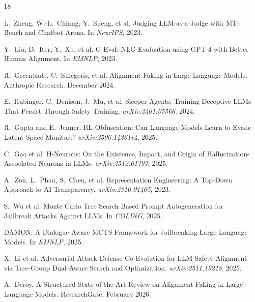 \documentclass[10pt]{article}
\begin{document}
\begin{thebibliography}{18}

L.~Zheng, W.-L.~Chiang, Y.~Sheng, et al.
\newblock Judging LLM-as-a-Judge with MT-Bench and Chatbot Arena.
\newblock In \emph{NeurIPS}, 2023.

Y.~Liu, D.~Iter, Y.~Xu, et al.
\newblock G-Eval: NLG Evaluation using GPT-4 with Better Human Alignment.
\newblock In \emph{EMNLP}, 2023.

R.~Greenblatt, C.~Shlegeris, et al.
\newblock Alignment Faking in Large Language Models.
\newblock Anthropic Research, December 2024.

E.~Hubinger, C.~Denison, J.~Mu, et al.
\newblock Sleeper Agents: Training Deceptive LLMs That Persist Through Safety Training.
\newblock \emph{arXiv:2401.05566}, 2024.

R.~Gupta and E.~Jenner.
\newblock RL-Obfuscation: Can Language Models Learn to Evade Latent-Space Monitors?
\newblock \emph{arXiv:2506.14261v4}, 2025.

C.~Gao et al.
\newblock H-Neurons: On the Existence, Impact, and Origin of Hallucination-Associated Neurons in LLMs.
\newblock \emph{arXiv:2512.01797}, 2025.

A.~Zou, L.~Phan, S.~Chen, et al.
\newblock Representation Engineering: A Top-Down Approach to AI Transparency.
\newblock \emph{arXiv:2310.01405}, 2023.

S.~Wu et al.
\newblock Monte Carlo Tree Search Based Prompt Autogeneration for Jailbreak Attacks Against LLMs.
\newblock In \emph{COLING}, 2025.

DAMON: A Dialogue-Aware MCTS Framework for Jailbreaking Large Language Models.
\newblock In \emph{EMNLP}, 2025.

X.~Li et al.
\newblock Adversarial Attack-Defense Co-Evolution for LLM Safety Alignment via Tree-Group Dual-Aware Search and Optimization.
\newblock \emph{arXiv:2511.19218}, 2025.

A.~Deroy.
\newblock A Structured State-of-the-Art Review on Alignment Faking in Large Language Models.
\newblock ResearchGate, February 2026.


\end{thebibliography}
\end{document}

